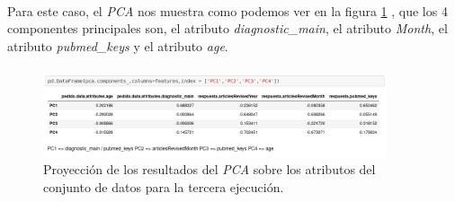 \newpage
\paragraph{}
Para este caso, el \textit{PCA} nos muestra como podemos ver en la figura \ref{pcaThreeAtributos} , que los 4 componentes principales son, el atributo \textit{diagnostic\_main}, el atributo \textit{Month}, el atributo \textit{pubmed\_keys} y el atributo \textit{age}.

\paragraph{}
\begin{figure}[!htb]
  \centering
    \includegraphics[width=0.9\textwidth]{images/resultados_procesado_de_datos_pca3_atributos.png}
    \caption{Proyección de los resultados del \textit{PCA} sobre los atributos del conjunto de datos para la tercera ejecución.}
  \label{pcaThreeAtributos}
\end{figure}
